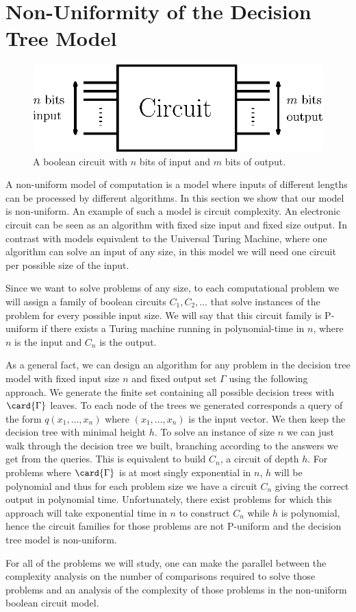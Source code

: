 \section{Non-Uniformity of the Decision Tree Model}
\label{tree:sorting:nonuniformity}

\begin{figure}
\center
\includegraphics[height=0.2\textheight]{fig/sorting/model/circuit}
\caption{A boolean circuit with \(n\) bits of input and \(m\) bits of output.}
\label{fig:sorting:nonuniformity:circuit}
\end{figure}

A non-uniform model of computation is a model where inputs of different
lengths can be processed by different algorithms. In this section we show that
our model is non-uniform. An example of such a model is circuit complexity. An
electronic circuit can be seen as an algorithm with fixed size input and fixed
size output. In contrast with models equivalent to the Universal Turing
Machine, where one algorithm can solve an input of any size, in this model we
will need one circuit per possible size of the input.

Since we want to solve problems of any size, to each computational problem we
will assign a family of boolean circuits \(C_1,C_2,\ldots\) that solve
instances of the problem for every possible input size. We will say that this
circuit family is P-uniform if there exists a Turing machine running in
polynomial-time in \(n\), where \(n\) is the input and \(C_n\) is the output.

As a general fact, we can design an algorithm for any problem in the decision
tree model with fixed input size \(n\) and fixed output set \(\Gamma\) using
the following approach. We generate the finite set containing all possible
decision trees with \(\card{\Gamma}\) leaves. To each node of the trees we
generated corresponds a query of the form \(q(x_1,\ldots,x_n)\) where
\((x_1,\ldots,x_n)\) is the input vector. We then keep the decision tree with
minimal height \(h\). To solve an instance of size \(n\) we can just walk
through the decision tree we built, branching according to the answers we get
from the queries. This is equivalent to build \(C_n\), a circuit of depth
\(h\). For problems where \(\card{\Gamma}\) is at most singly exponential in
\(n\), \(h\) will be polynomial and thus for each problem size we have a
circuit \(C_n\) giving the correct output in polynomial time. Unfortunately,
there exist problems for which this approach will take exponential time in
\(n\) to construct \(C_n\) while \(h\) is polynomial, hence the circuit
families for those problems are not P-uniform and the decision tree model is
non-uniform.

For all of the problems we will study, one can make the parallel between the
complexity analysis on the number of comparisons required to solve those
problems and an analysis of the complexity of those problems in the non-uniform
boolean circuit model.

